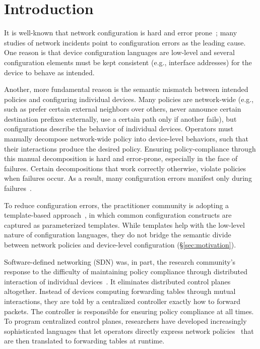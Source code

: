 \section{Introduction}
\label{sec:introduction}

It is well-known that network configuration is hard and error prone~\cite{x,y,z}; many studies of network incidents point to configuration errors as the leading cause.
%
One reason is that device configuration languages are low-level and several configuration elements must be kept consistent (e.g., interface addresses) for the device to behave as intended.
%

Another, more fundamental reason is the semantic mismatch between intended policies and configuring individual devices.
%
Many policies are network-wide (e.g., such as prefer certain external neighbors over others, never announce certain destination prefixes externally, use a certain path only if another fails), but configurations describe the behavior of individual devices.
%
Operators must manually decompose network-wide policy into device-level behaviors, such that their interactions produce the desired policy.
%
Ensuring policy-compliance through this manual decomposition is hard and error-prone, especially in the face of failures. Certain decompositions that work correctly otherwise, violate policies when failures occur.
%
As a result, many configuration errors manifest only during failures~\cite{batfish}.

To reduce configuration errors, the practitioner community is adopting a template-based approach~\cite{x,y}, in which common configuration constructs are captured as parameterized templates.
 While templates help with the low-level nature of configuration languages, they do not bridge the semantic divide between network policies and device-level configuration (\S\ref{sec:motivation}).

Software-defined networking (SDN) was, in part, the research community's response to the difficulty of maintaining policy compliance through distributed interaction of individual devices~\cite{xx}. It eliminates distributed control planes altogether. Instead of devices computing  forwarding tables through mutual interactions, they are told by a centralized controller exactly how to forward packets. The controller is responsible for ensuring policy compliance at all times. To program centralized control planes, researchers have developed increasingly sophisticated languages that let operators directly express network policies~\cite{x,y,z} that are then translated to forwarding tables at runtime.

